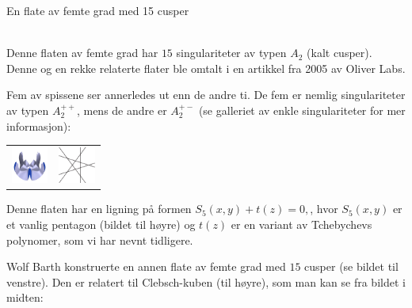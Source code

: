 \documentclass[no]{./../../common/SurferDesc}%
\begin{document}
\footnotesize




\begin{surferPage}
  \begin{surferTitle}En flate av femte grad med 15 cusper\end{surferTitle}   \\
  
  Denne flaten av femte grad har $15$ singulariteter av typen $A_2$ (kalt cusper). 
  Denne og en rekke relaterte flater ble omtalt i en artikkel fra 2005 av Oliver Labs. 

Fem av spissene ser annerledes ut enn de andre ti. De fem er nemlig singulariteter av 
typen $A_2^{++}$, mens de andre er $A_2^{+-}$ (se galleriet av enkle singulariteter for mer informasjon): 

     \vspace*{-0.3em}
    \begin{center}
      \begin{tabular}{c@{\qquad}c}
        \includegraphics[height=1.2cm]{./../../common/images/dessins_quint_15a2}
        &
        \includegraphics[height=1.2cm]{./../../common/images/rp5.pdf}
      \end{tabular}
    \end{center}
    \vspace*{-0.3em}    
    
	Denne flaten har en ligning på formen $S_5(x,y) + t(z)=0,$, hvor $S_5(x,y)$ er et vanlig pentagon 
	(bildet til høyre) og $t(z)$ er en variant av Tchebychevs polynomer, som vi har nevnt tidligere. 
    
	
	Wolf Barth konstruerte en annen flate av femte grad med $15$ cusper (se bildet til venstre). 
	Den er relatert til Clebsch-kuben (til høyre), som man kan se fra bildet i midten:



\end{surferPage}
\end{document}
